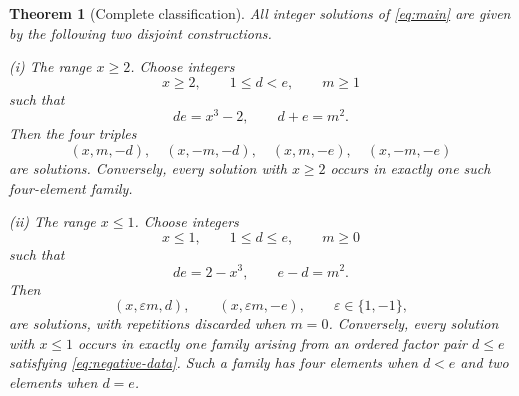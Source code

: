 \documentclass[11pt,a4paper]{amsart}
\newtheorem{theorem}{Theorem}[section]
\theoremstyle{remark}
\newcommand{\eps}{\varepsilon}
\begin{document}
\begin{theorem}[Complete classification]\label{thm:classification}
All integer solutions of \eqref{eq:main} are given by the following two disjoint constructions.

\medskip
\noindent
\textup{(i) The range $x\geq 2$.}
Choose integers
\[
 x\geq 2,\qquad 1\leq d<e,\qquad m\geq 1
\]
such that
\begin{equation}\label{eq:positive-data}
 de=x^3-2,
 \qquad d+e=m^2.
\end{equation}
Then the four triples
\begin{equation}\label{eq:positive-solutions}
 (x,m,-d),\quad (x,-m,-d),\quad
 (x,m,-e),\quad (x,-m,-e)
\end{equation}
are solutions.  Conversely, every solution with $x\geq 2$ occurs in exactly one such four-element family.

\medskip
\noindent
\textup{(ii) The range $x\leq 1$.}
Choose integers
\[
 x\leq 1,\qquad 1\leq d\leq e,\qquad m\geq 0
\]
such that
\begin{equation}\label{eq:negative-data}
 de=2-x^3,
 \qquad e-d=m^2.
\end{equation}
Then
\begin{equation}\label{eq:negative-solutions}
 (x,\eps m,d),\qquad (x,\eps m,-e),
 \qquad \eps\in\{1,-1\},
\end{equation}
are solutions, with repetitions discarded when $m=0$.  Conversely, every solution with $x\leq 1$ occurs in exactly one family arising from an ordered factor pair $d\leq e$ satisfying \eqref{eq:negative-data}.  Such a family has four elements when $d<e$ and two elements when $d=e$.
\end{theorem}
\end{document}
